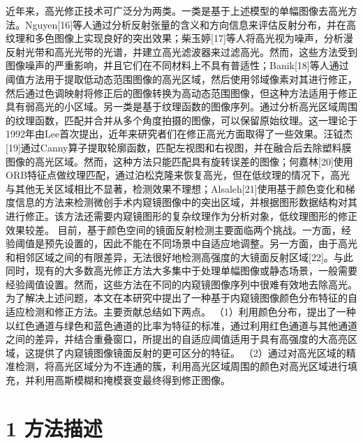\documentclass[UTF8,a4paper,12pt]{ctexart}
\begin{document}
近年来，高光修正技术可广泛分为两类。一类是基于上述模型的单幅图像去高光方法。Nguyen[16]等人通过分析反射张量的含义和方向信息来评估反射分布，并在高纹理和多色图像上实现良好的突出效果；柴玉婷[17]等人将高光视为噪声，分析漫反射光带和高光光带的光谱，并建立高光滤波器来过滤高光。然而，这些方法受到图像噪声的严重影响，并且它们在不同材料上不具有普适性；Banik[18]等人通过阈值方法用于提取低动态范围图像的高光区域，然后使用邻域像素对其进行修正，然后通过色调映射将修正后的图像转换为高动态范围图像，但这种方法适用于修正具有弱高光的小区域。另一类是基于纹理函数的图像序列。通过分析高光区域周围的纹理函数，匹配并合并从多个角度拍摄的图像，可以保留原始纹理。这一理论于1992年由Lee首次提出，近年来研究者们在修正高光方面取得了一些效果。汪钺杰[19]通过Canny算子提取轮廓函数，匹配左视图和右视图，并在融合后去除塑料膜图像的高光区域。然而，这种方法只能匹配具有旋转误差的图像；何嘉林[20]使用ORB特征点做纹理匹配，通过泊松克隆来恢复高光，但在低纹理的情况下，高光与其他无关区域相比不显著，检测效果不理想；Alsaleh[21]使用基于颜色变化和梯度信息的方法来检测微创手术内窥镜图像中的突出区域，并根据图形数据结构对其进行修正。该方法还需要内窥镜图形的复杂纹理作为分析对象，低纹理图形的修正效果较差。
目前，基于颜色空间的镜面反射检测主要面临两个挑战。一方面，经验阈值是预先设置的，因此不能在不同场景中自适应地调整。另一方面，由于高光和相邻区域之间的有限差异，无法很好地检测高强度的大镜面反射区域[22]。与此同时，现有的大多数高光修正方法大多集中于处理单幅图像或静态场景，一般需要经验阈值设置。然而，这些方法在不同的内窥镜图像序列中很难有效地去除高光。为了解决上述问题，本文在本研究中提出了一种基于内窥镜图像颜色分布特征的自适应检测和修正方法。主要贡献总结如下两点。
（1）利用颜色分布，提出了一种以红色通道与绿色和蓝色通道的比率为特征的标准，通过利用红色通道与其他通道之间的差异，并结合重叠窗口，所提出的自适应阈值适用于具有高强度的大高亮区域，这提供了内窥镜图像镜面反射的更可区分的特征。
（2）通过对高光区域的精准检测，将高光区域分为不连通的簇，利用高光区域周围的颜色对高光区域进行填充，并利用高斯模糊和掩模衰变最终得到修正图像。
 
\section{1  方法描述}
\end{document}
